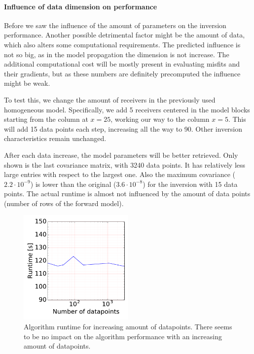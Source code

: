 \paragraph{Influence of data dimension on performance}
Before we saw the influence of the amount of parameters on the inversion performance. Another possible detrimental factor might be the amount of data, which also alters some computational requirements. The predicted influence is not so big, as in the model propagation the dimension is not increase. The additional computational cost will be mostly present in evaluating misfits and their gradients, but as these numbers are definitely precomputed the influence might be weak. 

To test this, we change the amount of receivers in the previously used homogeneous model. Specifically, we add 5 receivers centered in the model blocks starting from the column at $x=25$, working our way to the column $x=5$. This will add 15 data points each step, increasing all the way to 90. Other inversion characteristics remain unchanged.

After each data increase, the model parameters will be better retrieved. Only shown is the last covariance matrix, with 3240 data points. It has relatively less large entries with respect to the largest one. Also the maximum covariance ($2.2 \cdot 10^{-9}$) is lower than the original ($3.6 \cdot 10^{-8}$) for the inversion with 15 data points. The actual runtime is almost not influenced by the amount of data points (number of rows of the forward model).

\begin{figure}
	\centering
	
	\includegraphics[width=0.5\textwidth]{figures/tomography/tomography_1/increasing_data/performanceData}
	
	\caption{Algorithm runtime for increasing amount of datapoints. There seems to be no impact on the algorithm performance with an increasing amount of datapoints.}
	\label{fig:linear_tomography.model1.performanceData}
\end{figure}

